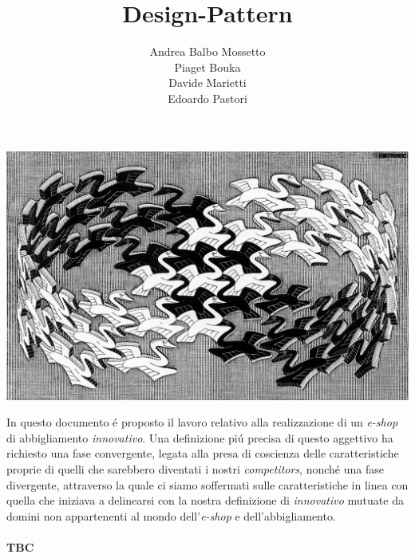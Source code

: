 \documentclass{article}
\title{\textbf{\huge Design-Pattern}}
\author{Andrea Balbo Mossetto \\ Piaget Bouka \\ Davide Marietti \\ Edoardo Pastori}
\date{}
\begin{document}
	\maketitle
	
	\begin{center}
	\includegraphics[scale=2]{design_pattern.jpeg}
	\end{center}
	
	
	\newpage
	
	\tableofcontents
	\newpage
	
	\listoffigures
	\newpage
	
	\abstract{}
	In questo documento \'e proposto il lavoro relativo alla realizzazione di un \textit{e-shop} di abbigliamento \textit{innovativo}. Una definizione pi\'u precisa di questo aggettivo ha richiesto una fase convergente, legata alla presa di coscienza delle caratteristiche proprie di quelli che sarebbero diventati i nostri \textit{competitors}, nonch\'e una fase divergente, attraverso la quale ci siamo soffermati sulle caratteristiche in linea con quella che iniziava a delinearsi con la nostra definizione di \textit{innovativo} mutuate da domini non appartenenti al mondo dell'\textit{e-shop} e dell'abbigliamento. 
	\\
	\\
	\textbf{TBC}
	
	\newpage
	
\end{document}

